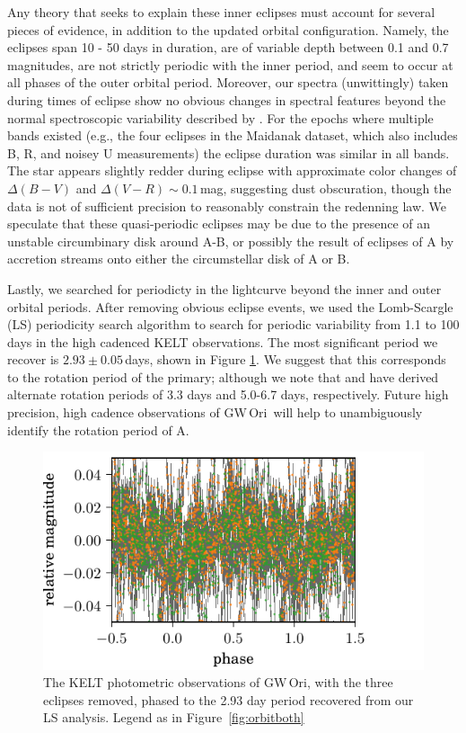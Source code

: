 \documentclass[twocolumn]{aastex61}
\newcommand{\obj}{GW\,Ori}
\begin{document}
Any theory that seeks to explain these inner eclipses must account for several pieces of evidence, in addition to the updated orbital configuration. Namely, the eclipses span 10 - 50 days in duration, are of variable depth between 0.1 and 0.7 magnitudes, are not strictly periodic with the inner period, and seem to occur at all phases of the outer orbital period. Moreover, our spectra (unwittingly) taken during times of eclipse show no obvious changes in spectral features beyond the normal spectroscopic variability described by \citet{fang14}. For the epochs where multiple bands existed (e.g., the four eclipses in the Maidanak dataset, which also includes B, R, and noisey U measurements) the eclipse duration was similar in all bands. The star appears slightly redder during eclipse with approximate color changes of $\Delta (B - V)$ and $\Delta (V - R) \sim 0.1$\,mag, suggesting dust obscuration, though the data is not of sufficient precision to reasonably constrain the redenning law. We speculate that these quasi-periodic eclipses may be due to the presence of an unstable circumbinary disk around A-B, or possibly the result of eclipses of A by accretion streams onto either the circumstellar disk of A or B.

Lastly, we searched for periodicty in the lightcurve beyond the inner and outer orbital periods.
After removing obvious eclipse events, we used the Lomb-Scargle (LS) periodicity search algorithm \citep{lomb76,scargle82}  \citep[within the VARTOOLS analysis package;][]{hartman16} to search for periodic variability from 1.1 to 100 days in the high cadenced KELT observations. The most significant period we recover is $2.93 \pm 0.05$\,days, shown in Figure \ref{fig:phased}. We suggest that this corresponds to the rotation period of the primary; although we note that \citet{bouvier90} and \citet{fang14} have derived alternate rotation periods of 3.3 days and 5.0-6.7 days, respectively. Future high precision, high cadence observations of \obj\ will help to unambiguously identify the rotation period of A.

\begin{figure}[!ht]
\includegraphics{rotation-phased.pdf}
\caption{The KELT photometric observations of \obj, with the three eclipses removed, phased to the 2.93 day period recovered from our LS analysis. Legend as in Figure~\ref{fig:orbitboth}}
\label{fig:phased}
\end{figure}
\end{document}

